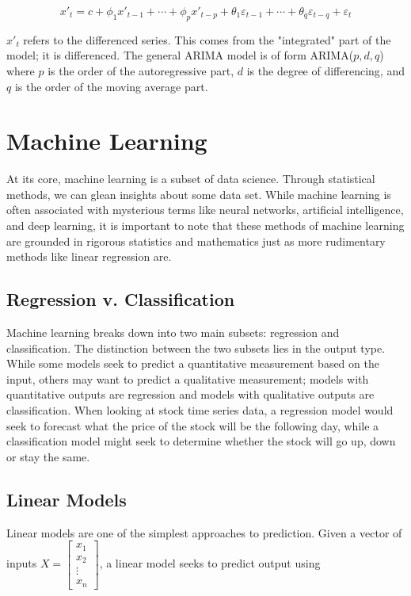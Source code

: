 \documentclass[12pt]{article}
\begin{document}
$$ x'_{t} = c + \phi_{1}x'_{t-1} + \cdots + \phi_{p}x'_{t-p} + \theta_{1}\varepsilon_{t-1} + \cdots + \theta_{q}\varepsilon_{t-q} + \varepsilon_{t} $$

$x'_t$ refers to the differenced series. This comes from the "integrated" part of the model; it is differenced. The general ARIMA model is of form ARIMA($p,d,q$) where $p$ is the order of the autoregressive part, $d$ is the degree of differencing, and $q$ is the order of the moving average part. \cite[8.5]{forecasting}



\section{Machine Learning} 
At its core, machine learning is a subset of data science. Through statistical methods, we can glean insights about some data set. While machine learning is often associated with mysterious terms like neural networks, artificial intelligence, and deep learning, it is important to note that these methods of machine learning are grounded in rigorous statistics and mathematics just as more rudimentary methods like linear regression are.

\subsection{Regression v. Classification}
Machine learning breaks down into two main subsets: regression and classification. The distinction between the two subsets lies in the output type. While some models seek to predict a quantitative measurement based on the input, others may want to predict a qualitative measurement; models with quantitative outputs are regression and models with qualitative outputs are classification. \cite[9-10]{springer} When looking at stock time series data, a regression model would seek to forecast what the price of the stock will be the following day, while a classification model might seek to determine whether the stock will go up, down or stay the same. 

\subsection{Linear Models}
Linear models are one of the simplest approaches to prediction. Given a vector of inputs 
$X =  \begin{bmatrix} 
x_1 \\
x_2 \\
\vdots \\
x_n
\end{bmatrix}
$, a linear model seeks to predict output using 
\end{document}
